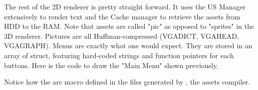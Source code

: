\par
The rest of the 2D renderer is pretty straight forward. It uses the US Manager extensively to render text and the Cache manager to retrieve the assets from HDD to the RAM. Note that assets are called "pic" as opposed to "sprites" in the 3D renderer. Pictures are all Huffman-compressed (VGADICT, VGAHEAD, VGAGRAPH). Menus are exactly what one would expect. They are stored in an array of struct, featuring hard-coded strings and function pointers for each buttons. Here is the code to draw the "Main Menu" shown previously.\\

\par
\begin{minipage}{\textwidth}

\end{minipage}

\par
\begin{minipage}{\textwidth}

\end{minipage}
\par
Notice how the  are macro defined in the files generated by , the assets compiler.

